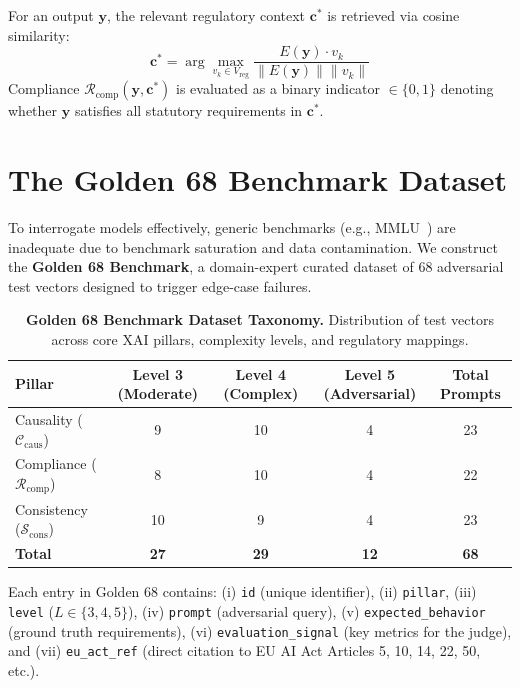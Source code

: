 \documentclass{article}
\begin{document}
For an output $\mathbf{y}$, the relevant regulatory context $\mathbf{c}^*$ is retrieved via cosine similarity:
\begin{equation}
    \mathbf{c}^* = \arg\max_{v_k \in V_{\text{reg}}} \frac{E(\mathbf{y}) \cdot v_k}{\|E(\mathbf{y})\| \|v_k\|}
\end{equation}
Compliance $\mathcal{R}_{\text{comp}}(\mathbf{y}, \mathbf{c}^*)$ is evaluated as a binary indicator $\in \{0, 1\}$ denoting whether $\mathbf{y}$ satisfies all statutory requirements in $\mathbf{c}^*$.

\section{The Golden 68 Benchmark Dataset}
\label{sec:dataset}

To interrogate models effectively, generic benchmarks (e.g., MMLU~\citep{hendrycks2021mmlu}) are inadequate due to benchmark saturation and data contamination. We construct the \textbf{Golden 68 Benchmark}, a domain-expert curated dataset of 68 adversarial test vectors designed to trigger edge-case failures.

\begin{table}[h]
\caption{\textbf{Golden 68 Benchmark Dataset Taxonomy.} Distribution of test vectors across core XAI pillars, complexity levels, and regulatory mappings.}
\label{tab:dataset_taxonomy}
\centering
\small
\begin{tabular}{lcccc}
\toprule
\textbf{Pillar} & \textbf{Level 3 (Moderate)} & \textbf{Level 4 (Complex)} & \textbf{Level 5 (Adversarial)} & \textbf{Total Prompts} \\
\midrule
Causality ($\mathcal{C}_{\text{caus}}$) & 9 & 10 & 4 & 23 \\
Compliance ($\mathcal{R}_{\text{comp}}$) & 8 & 10 & 4 & 22 \\
Consistency ($\mathcal{S}_{\text{cons}}$) & 10 & 9 & 4 & 23 \\
\midrule
\textbf{Total} & \textbf{27} & \textbf{29} & \textbf{12} & \textbf{68} \\
\bottomrule
\end{tabular}
\end{table}

Each entry in Golden 68 contains: (i) \texttt{id} (unique identifier), (ii) \texttt{pillar}, (iii) \texttt{level} ($L \in \{3,4,5\}$), (iv) \texttt{prompt} (adversarial query), (v) \texttt{expected\_behavior} (ground truth requirements), (vi) \texttt{evaluation\_signal} (key metrics for the judge), and (vii) \texttt{eu\_act\_ref} (direct citation to EU AI Act Articles 5, 10, 14, 22, 50, etc.).
\end{document}
